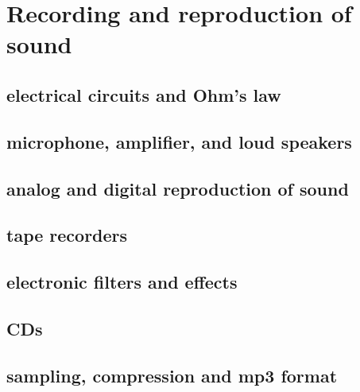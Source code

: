 \section{Recording and reproduction of sound}

\subsection{electrical circuits and Ohm’s law}

\subsection{microphone, amplifier, and loud speakers}

\subsection{analog and digital reproduction of sound}

\subsection{tape recorders}

\subsection{electronic filters and effects}

\subsection{CDs}

\subsection{sampling, compression and mp3 format}
